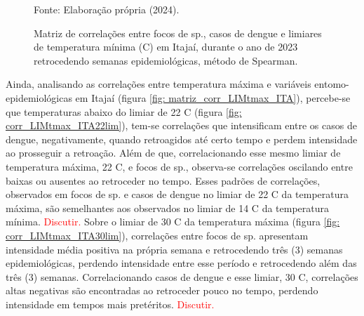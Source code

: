 \documentclass[
	12pt,				%
	openright,			%
	oneside,			%
	a4paper,			%
	english,			%
	french,				%
	spanish,			%
	brazil				%
	dvipsnames, table]{abntex2}
\begin{document}
\begin{figure}[htbp]
    \begin{center}
    \caption{Matriz de correlações entre focos de  sp., casos de dengue e limiares de temperatura mínima (C) em Itajaí, durante o ano de 2023 retrocedendo semanas epidemiológicas, método de Spearman.}
    \label{fig: matriz_corr_LIMtmin_ITA}
        \hfill
    \end{center}
    \small{Fonte: Elaboração própria (2024).}
\end{figure}

\indent Ainda, analisando as correlações entre temperatura máxima e variáveis entomo-epidemiológicas em Itajaí (figura \ref{fig: matriz_corr_LIMtmax_ITA}), percebe-se que temperaturas abaixo do limiar de 22 C (figura \ref{fig: corr_LIMtmax_ITA22lim}), tem-se correlações que intensificam entre os casos de dengue, negativamente, quando retroagidos até certo tempo e perdem intensidade ao prosseguir a retroação. Além de que, correlacionando esse mesmo limiar de temperatura máxima, 22 C, e focos de  sp., observa-se correlações oscilando entre baixas ou ausentes ao retroceder no tempo. Esses padrões de correlações, observados em focos de  sp. e casos de dengue no limiar de 22 C da temperatura máxima, são semelhantes aos observados no limiar de 14 C da temperatura mínima. \textcolor{red}{Discutir.} Sobre o limiar de 30 C da temperatura máxima (figura \ref{fig: corr_LIMtmax_ITA30lim}), correlações entre focos de  sp. apresentam intensidade média positiva na própria semana e retrocedendo três (3) semanas epidemiológicas, perdendo intensidade entre esse período e retrocedendo além das três (3) semanas. Correlacionando casos de dengue e esse limiar, 30 C, correlações altas negativas são encontradas ao retroceder pouco no tempo, perdendo intensidade em tempos mais pretéritos. \textcolor{red}{Discutir.}
\end{document}

